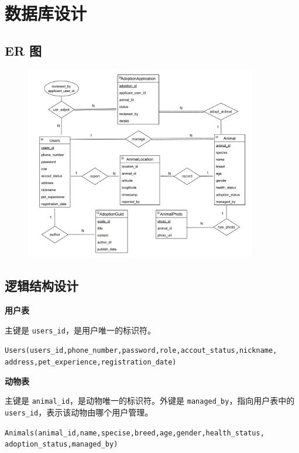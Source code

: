 \documentclass[12pt,a4paper,UTF8]{article}
\begin{document}
\section{数据库设计}

\subsection{ER 图}

\begin{figure}[H]
  \centering
  \includegraphics[width=0.9\textwidth]{figures/er.png}
\end{figure}


\subsection{逻辑结构设计}



\noindent\textbf{用户表}

主键是 \verb|users_id|，是用户唯一的标识符。

\verb|Users(users_id,phone_number,password,role,accout_status,nickname,| \\ \verb|address,pet_experience,registration_date)|


\vspace{0.25cm}

\noindent\textbf{动物表}

主键是 \verb|animal_id|，是动物唯一的标识符。外键是 \verb|managed_by|，指向用户表中的 \verb|users_id|，表示该动物由哪个用户管理。

\verb|Animals(animal_id,name,specise,breed,age,gender,health_status,| \\ \verb|adoption_status,managed_by)|
\end{document}
